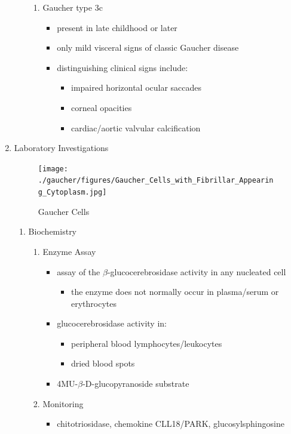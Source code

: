 \documentclass{scrartcl}
\begin{document}
\begin{enumerate}
\begin{enumerate}
\begin{enumerate}
\item Gaucher type 3c
\label{sec:org1013582}
\begin{itemize}
\item present in late childhood or later
\item only mild visceral signs of classic Gaucher disease
\item distinguishing clinical signs include:
\begin{itemize}
\item impaired horizontal ocular saccades
\item corneal opacities
\item cardiac/aortic valvular calcification
\end{itemize}
\end{itemize}
\end{enumerate}
\end{enumerate}

\item Laboratory Investigations
\label{sec:orgc27d015}
\begin{figure}[htbp]
\centering
\texttt{[image: ./gaucher/figures/Gaucher\_Cells\_with\_Fibrillar\_Appearing\_Cytoplasm.jpg]}
\caption{\label{fig:orgd128609}
Gaucher Cells}
\end{figure}

\begin{enumerate}
\item Biochemistry
\label{sec:org88a88e2}
\begin{enumerate}
\item Enzyme Assay
\label{sec:orgb55e021}
\begin{itemize}
\item assay of the \(\beta\)-glucocerebrosidase activity in any nucleated cell
\begin{itemize}
\item the enzyme does not normally occur in plasma/serum or erythrocytes
\end{itemize}
\item glucocerebrosidase activity in:
\begin{itemize}
\item peripheral blood lymphocytes/leukocytes
\item dried blood spots
\end{itemize}
\item 4MU-\(\beta\)-D-glucopyranoside substrate
\end{itemize}

\item Monitoring
\label{sec:orgf517208}
\begin{itemize}
\item chitotriosidase, chemokine CLL18/PARK, glucosylsphingosine
\end{itemize}
\end{enumerate}


\end{enumerate}
\end{enumerate}
\end{document}
